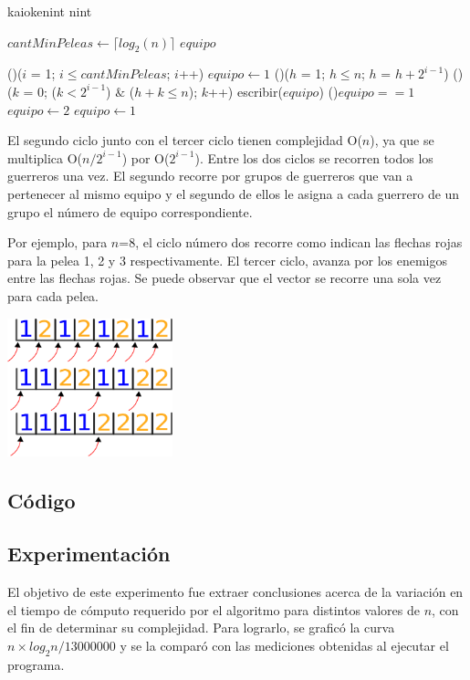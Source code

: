     \begin{algoritmo}{kaioken}{int n}{int}

   $cantMinPeleas \gets \lceil log_{2}(n) \rceil$ 
   $equipo$ 

  \For(){($i$ = 1; $i \leq cantMinPeleas$; $i$++)}{
    $equipo \gets 1$ 
    \For(){($h$ = 1; $h \leq n$; $h$ = $h + 2^{i-1}$)}{
      \For(){($k$ = 0; ($k < 2^{i-1}$) $\&$ ($h+k \leq n$); $k$++)}{
        escribir($equipo$) 
      }
        \eIf(){$equipo == 1$}{
          $equipo \gets 2$ \;
        }{
          $equipo \gets 1$ \;
        }
    }
  }


\end{algoritmo}

El segundo ciclo junto con el tercer ciclo tienen complejidad O($n$), ya que se multiplica O($n/2^{i-1}$) por O($2^{i-1}$). Entre los dos ciclos se recorren todos los guerreros una vez. El segundo recorre por grupos de guerreros que van a pertenecer al mismo equipo y el segundo de ellos le asigna a cada guerrero de un grupo el número de equipo correspondiente. 

Por ejemplo, para $n$=8, el ciclo número dos recorre como indican las flechas rojas para la pelea 1, 2 y 3 respectivamente. El tercer ciclo, avanza por los enemigos entre las flechas rojas. Se puede observar que el vector se recorre una sola vez para cada pelea. 


\includegraphics[height=4cm]{graficos/ciclo.png}


    \subsection{Código}


    \subsection{Experimentación}
		El objetivo de este experimento fue extraer conclusiones acerca de la variación en el tiempo de cómputo requerido por el algoritmo para distintos valores de $n$, con el fin de determinar su complejidad. 
    Para lograrlo, se graficó la curva $n \times log_{2}n / 13000000$ y se la comparó con las mediciones obtenidas al ejecutar el programa.

